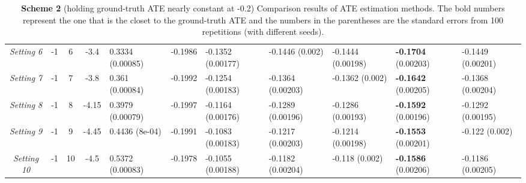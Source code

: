\documentclass{article}
\begin{document}
\begin{table}[H]
\begin{tabular}{ccccp{15mm}||cp{15mm}p{15mm}p{15mm}p{15mm}p{15mm}}
			\textsl{Setting 6} & -1 & 6 & -3.4 & 0.3334 \newline (0.00085) & -0.1986 & -0.1352 \newline (0.00177) & -0.1446 \newline (0.002) & -0.1444 \newline (0.00198) &\textbf{ -0.1704} \newline (0.00203) & -0.1449 \newline (0.00201) \\ 
			\textsl{Setting 7} & -1 & 7 & -3.8 & 0.361 \newline (0.00084) & -0.1992 & -0.1254 \newline (0.00183) & -0.1364 \newline (0.00203) & -0.1362 \newline (0.002) & \textbf{-0.1642} \newline (0.00205) & -0.1368 \newline (0.00204) \\ 
			\textsl{Setting 8} & -1 & 8 & -4.15 & 0.3979 \newline (0.00079) & -0.1997 & -0.1164 \newline (0.00176) & -0.1289 \newline (0.00196) & -0.1286 \newline (0.00193) & \textbf{-0.1592} \newline (0.00196) & -0.1292 \newline (0.00195) \\ 
			\textsl{Setting 9} & -1 & 9 & -4.45 & 0.4436 \newline (8e-04) & -0.1991 & -0.1083 \newline (0.00183) & -0.1217 \newline (0.00203) & -0.1214 \newline (0.00198) & \textbf{-0.1553} \newline (0.00201) & -0.122 \newline (0.002) \\ 
			\textsl{Setting 10} & -1 & 10 & -4.5 & 0.5372 \newline (0.00083) & -0.1978 & -0.1055 \newline (0.00188) & -0.1182 \newline (0.00204) & -0.118 \newline (0.002) & \textbf{-0.1586} \newline (0.00206) & -0.1186 \newline (0.00205) \\  \hline
		\end{tabular}
		\vspace{1em}
		\caption{\textbf{Scheme 2} (holding ground-truth ATE nearly constant at -0.2)  Comparison results of ATE estimation methods. The bold numbers represent the one that is the closet to the ground-truth ATE and the numbers in the parentheses are the standard errors from 100 repetitions (with different seeds). }
		\label{tab:results2}
	\end{table}
	
\end{document}
